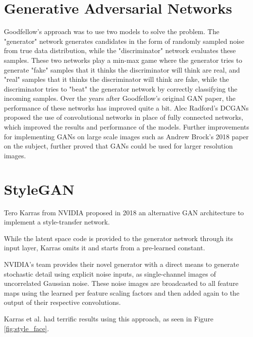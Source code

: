 \section{Generative Adversarial Networks}
Goodfellow's approach was to use two models to solve the problem. The "generator" network generates candidates in the form of randomly sampled noise from true data distribution, while the "discriminator" network evaluates these samples. These two networks play a min-max game where the generator tries to generate "fake" samples that it thinks the discriminator will think are real, and "real" samples that it thinks the discriminator will think are fake, while the discriminator tries to "beat" the generator network by correctly classifying the incoming samples.
Over the years after Goodfellow's original GAN paper, the performance of these networks has improved quite a bit. Alec Radford's DCGANs\cite{radford_metz_chintala_2015} proposed the use of convolutional networks in place of fully connected networks, which improved the results and performance of the models. Further improvements for implementing GANs on large scale images such as Andrew Brock's 2018 \cite{DBLP:journals/corr/abs-1809-11096} paper on the subject, further proved that GANs could be used for larger resolution images.

\section{StyleGAN}

Tero Karras from NVIDIA proposed in 2018 an alternative GAN architecture to implement a style-transfer network.\cite{DBLP:journals/corr/abs-1912-04958} 

While the latent space code is provided to the generator network through its input layer, Karras omits it and starts from a pre-learned constant. 

NVIDIA's team provides their novel generator with a direct means to generate stochastic detail using explicit noise inputs, as single-channel images of uncorrelated Gaussian noise. These noise images are broadcasted to all feature maps using the learned per feature scaling factors and then added again to the output of their respective convolutions. 

Karras et al. had terrific results using this approach, as seen in Figure \ref{fig:style_face}.

